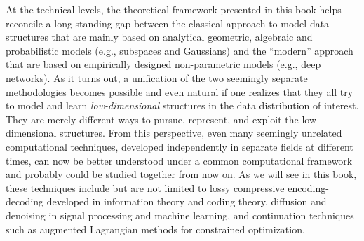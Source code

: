 \documentclass[../../book-main.tex]{subfiles}
\begin{document}
At the technical levels, the theoretical framework presented in this book helps reconcile a long-standing gap between the classical approach to model data structures that are mainly based on analytical geometric, algebraic and probabilistic models (e.g., subspaces and Gaussians) and the ``modern'' approach that are based on empirically designed non-parametric models (e.g., deep networks). As it turns out, a unification of the two seemingly separate methodologies becomes possible and even natural if one realizes that they all try to model and learn {\em low-dimensional} structures in the data distribution of interest. They are merely different ways to pursue, represent, and exploit the low-dimensional structures. From this perspective, even many seemingly unrelated computational techniques, developed independently in separate fields at different times, can now be better understood under a common computational framework and probably could be studied together from now on. As we will see in this book, these techniques include but are not limited to lossy compressive encoding-decoding developed in information theory and coding theory, diffusion and denoising in signal processing and machine learning, and continuation techniques such as augmented Lagrangian methods for constrained optimization. 
\end{document}

